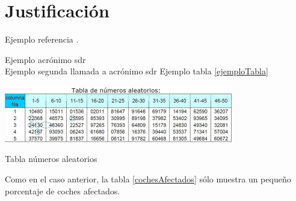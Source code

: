 \section{Justificación}
 Ejemplo referencia \citep{ejemploReferencia}.\par
 Ejemplo acrónimo \gls{sdr}\\
 Ejemplo segunda llamada a acrónimo \gls{sdr}
 Ejemplo tabla \ref{ejemploTabla}
 
 
 \begin{table}[h]
 	\centering
 	\includegraphics[width=100mm]{includes/ejemplo_tabla.jpg}
 	\caption[Tabla números aleatorios]{Tabla números aleatorios \citep{ejemploReferencia}}
 	\label{ejemploTabla}
 \end{table}
 Como en el caso anterior, la tabla \ref{cochesAfectados} sólo muestra un pequeño porcentaje de coches afectados.
